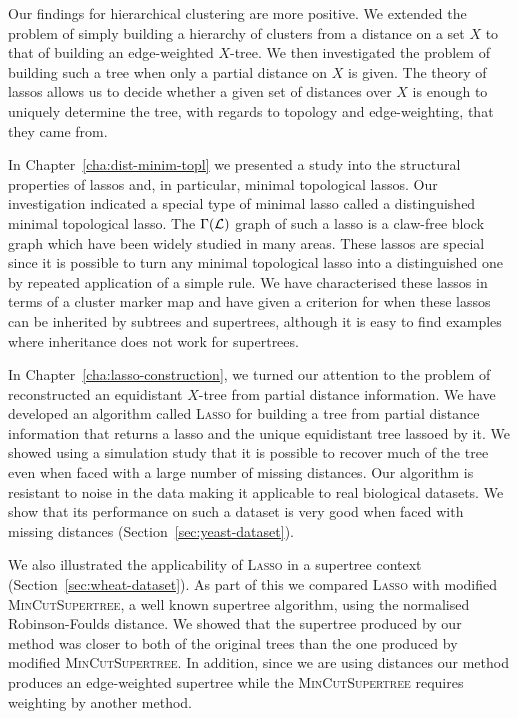 Our findings for hierarchical clustering are more positive.  We extended the
problem of simply building a hierarchy of clusters from a distance on a set
$X$ to that of building an edge-weighted $X$-tree.  We then investigated the
problem of building such a tree when only a partial distance on $X$ is given.
The theory of lassos allows us to decide whether a given set of distances over
$X$ is enough to uniquely determine the tree, with regards to topology and
edge-weighting, that they came from.

In Chapter~\ref{cha:dist-minim-topl} we presented a study into the structural
properties of lassos and, in particular, minimal topological lassos.  Our
investigation indicated a special type of minimal lasso called a distinguished
minimal topological lasso.  The $\Gamma({\mathcal L})$ graph of such a lasso is a
claw-free block graph which have been widely studied in many areas.  These
lassos are special since it is possible to turn any minimal topological lasso
into a distinguished one by repeated application of a simple rule.  We have
characterised these lassos in terms of a cluster marker map and have given a
criterion for when these lassos can be inherited by subtrees and supertrees,
although it is easy to find examples where inheritance does not work for
supertrees.

In Chapter~\ref{cha:lasso-construction}, we turned our attention to the
problem of reconstructed an equidistant $X$-tree from partial distance
information.  We have developed an algorithm called \textsc{Lasso} for
building a tree from partial distance information that returns a lasso and the
unique equidistant tree lassoed by it.  We showed using a simulation study
that it is possible to recover much of the tree even when faced with a large
number of missing distances.  Our algorithm is resistant to noise in the data
making it applicable to real biological datasets.  We show that its
performance on such a dataset is very good when faced with missing distances
(Section~\ref{sec:yeast-dataset}).

We also illustrated the applicability of \textsc{Lasso} in a supertree context
(Section~\ref{sec:wheat-dataset}).  As part of this we compared \textsc{Lasso}
with modified \textsc{MinCutSupertree}, a well known supertree algorithm,
using the normalised Robinson-Foulds distance.  We showed that the supertree
produced by our method was closer to both of the original trees than the one
produced by modified \textsc{MinCutSupertree}.  In addition, since we are
using distances our method produces an edge-weighted supertree while the
\textsc{MinCutSupertree} requires weighting by another method.

